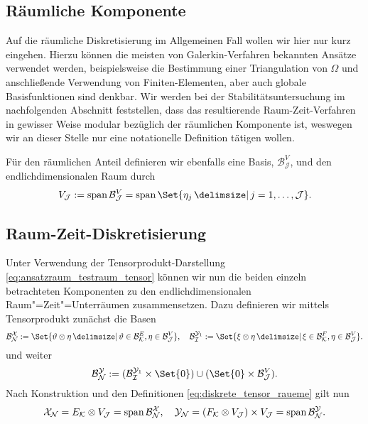 \documentclass[../main.tex]{subfiles}
\begin{document}
\subsection*{Räumliche Komponente} %

Auf die räumliche Diskretisierung im Allgemeinen Fall wollen wir hier nur kurz eingehen.
Hierzu können die meisten von Galerkin-Verfahren bekannten Ansätze verwendet werden, beispielsweise die Bestimmung einer Triangulation von $\Omega$ und anschließende Verwendung von Finiten-Elementen, aber auch globale Basisfunktionen sind denkbar.
Wir werden bei der Stabilitätsuntersuchung im nachfolgenden Abschnitt feststellen, dass das resultierende Raum-Zeit-Verfahren in gewisser Weise modular bezüglich der räumlichen Komponente ist, weswegen wir an dieser Stelle nur eine notationelle Definition tätigen wollen.

Für den räumlichen Anteil definieren wir ebenfalls eine Basis, $\mathcal B^{V}_{\mathcal J}$, und den endlichdimensionalen Raum durch
\begin{equation}
    \label{eq:raeumlicher_anteil}
    V_{\mathcal J} := \spn \mathcal B^{V}_{\mathcal J} = \spn \Set{ \eta_{j} \given j = 1, \dots, \mathcal J}.
\end{equation}


\subsection*{Raum-Zeit-Diskretisierung} %

Unter Verwendung der Tensorprodukt-Darstellung \cref{eq:ansatzraum_testraum_tensor} können wir nun die beiden einzeln betrachteten Komponenten zu den endlichdimensionalen Raum"=Zeit"=Unterräumen zusammensetzen.
Dazu definieren wir mittels Tensorprodukt zunächst die Basen
\begin{equation}
\label{eq:diskreter_ansatzraum_basis_phi}
\label{eq:diskreter_testraum_basis_psi1}
    \mathcal B^{\mathcal X}_{\mathcal N} := \Set{\theta \otimes \eta \given \theta \in \mathcal B^{E}_{\mathcal K}, \eta \in \mathcal B^{V}_{\mathcal J}}, \quad
    \mathcal B^{\mathcal Y_{1}}_{\mathcal I} := \Set{\xi \otimes \eta \given \xi \in \mathcal B^{F}_{\mathcal K}, \eta \in \mathcal B^{V}_{\mathcal J}}.
\end{equation}
und weiter
\begin{equation}
\label{eq:diskreter_testraum_basis_psi}
    \mathcal B^{\mathcal Y}_{\mathcal N} := (\mathcal B^{\mathcal Y_{1}}_{\mathcal I} \times \Set{ 0 }) \cup (\Set{0} \times \mathcal B^{V}_{\mathcal J}).
\end{equation}
Nach Konstruktion und den Definitionen \cref{eq:diskrete_tensor_raueme} gilt nun
\begin{equation}
    \label{eq:diskreter_ansatz_und_testraum_als_span}
    \mathcal X_{\mathcal N} = E_{\mathcal K} \otimes V_{\mathcal J} = \operatorname{span} \mathcal B^{\mathcal X}_{\mathcal N},
    \quad
    \mathcal Y_{\mathcal N} = (F_{\mathcal K} \otimes V_{\mathcal J}) \times V_{\mathcal J} = \operatorname{span} \mathcal B^{\mathcal Y}_{\mathcal N}.
\end{equation}
\end{document}
